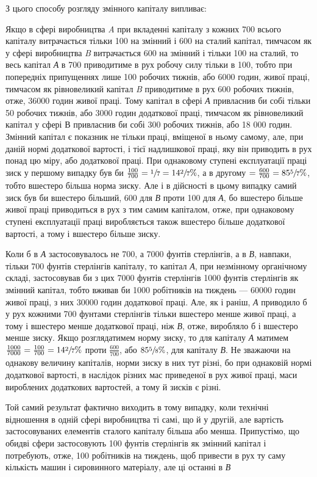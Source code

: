 
З цього способу розгляду змінного капіталу випливає:

Якщо в сфері виробництва \emph{A} при вкладенні капіталу з кожних 700 всього
капіталу витрачається тільки 100 на змінний
і 600 на сталий капітал, тимчасом як у сфері виробництва \emph{B}
витрачається 600 на змінний і тільки 100 на сталий, то весь
капітал \emph{А} в 700 приводитиме в рух робочу силу тільки в 100,
тобто при попередніх припущеннях лише 100 робочих тижнів,
або 6000 годин, живої праці, тимчасом як рівновеликий капітал \emph{B}
приводитиме в рух 600 робочих тижнів, отже, 36000 годин живої праці.
Тому капітал в сфері \emph{А} привласнив би собі тільки
50 робочих тижнів, або 3000 годин додаткової праці, тимчасом
як рівновеликий капітал у сфері В привласнив би собі 300 робочих тижнів,
або 18 000 годин. Змінний капітал є показник не
тільки праці, вміщеної в ньому самому, але, при даній нормі
додаткової вартості, і тієї надлишкової праці, яку він приводить
в рух понад цю міру, або додаткової праці. При однаковому
ступені експлуатації праці зиск у першому випадку був би $\frac{100}{700} = \sfrac{1}{7} = 14\sfrac{2}{7}\%$, а
в другому $= \frac{600}{700} = 85\sfrac{5}{7}\%$, тобто вшестеро
більша норма зиску. Але і в дійсності в цьому випадку самий
зиск був би вшестеро більший, 600 для \emph{В} проти 100 для \emph{А}, бо
вшестеро більше живої праці приводиться в рух з тим самим
капіталом, отже, при однаковому ступені експлуатації праці
виробляється також вшестеро більше додаткової вартості, а тому
і вшестеро більше зиску.

Коли б в \emph{А} застосовувалось не 700, а 7000 фунтів стерлінгів, а
в \emph{В}, навпаки, тільки 700 фунтів стерлінгів капіталу, то
капітал \emph{А}, при незмінному органічному складі, застосовував би
з цих 7000 фунтів стерлінгів 1000 фунтів стерлінгів як змінний
капітал, тобто вживав би 1000 робітників на тиждень — 60000 годин живої праці,
з них 30000 годин додаткової праці. Але,
як і раніш, \emph{А} приводило б у рух кожними 700 фунтами стерлінгів тільки
вшестеро менше живої праці, а тому і вшестеро
менше додаткової праці, ніж \emph{В}, отже, виробляло б і вшестеро
менше зиску. Якщо розглядатимем норму зиску, то для капіталу \emph{А} матимем
$\frac{1000}{7000} = \frac{100}{700} = 14\sfrac{2}{7}\%$
проти $\frac{600}{700}$, або $85\sfrac{5}{8}\%$, для
капіталу \emph{В}. Не зважаючи на однакову величину капіталів, норми
зиску в них тут різні, бо при однаковій нормі додаткової
вартості, в наслідок різних мас приведеної в рух живої праці,
маси вироблених додаткових вартостей, а тому й зисків є різні.

Той самий результат фактично виходить в тому випадку, коли
технічні відношення в одній сфері виробництва ті самі, що й
у другій, але вартість застосовуваних елементів сталого капіталу більша або менша. Припустімо, що
обидві сфери застосовують 100 фунтів стерлінгів як змінний капітал і потребують, отже, 100
робітників на тиждень, щоб привести в рух ту саму
кількість машин і сировинного матеріалу, але ці останні в \emph{В}
\parbreak{}  %
